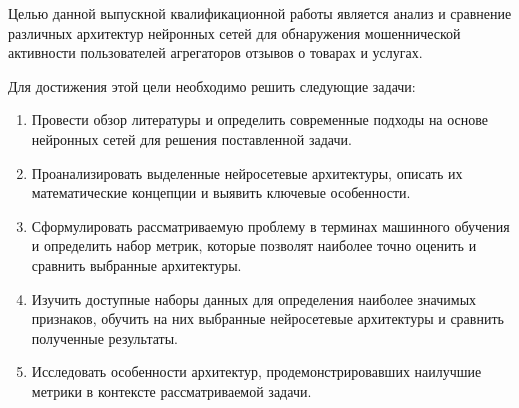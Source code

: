 
Целью данной выпускной квалификационной работы является анализ и сравнение различных архитектур нейронных сетей для обнаружения мошеннической активности пользователей агрегаторов отзывов о товарах и услугах.

Для достижения этой цели необходимо решить следующие задачи:

\begin{enumerate}

    \item Провести обзор литературы и определить современные подходы на основе нейронных сетей для решения поставленной задачи.
    
    \item Проанализировать выделенные нейросетевые архитектуры, описать их математические концепции и выявить ключевые особенности.
    
    \item Сформулировать рассматриваемую проблему в терминах машинного обучения и определить набор метрик, которые позволят наиболее точно оценить и сравнить выбранные архитектуры.
    
    \item Изучить доступные наборы данных для определения наиболее значимых признаков, обучить на них выбранные нейросетевые архитектуры и сравнить полученные результаты.

    \item Исследовать особенности архитектур, продемонстрировавших наилучшие метрики в контексте рассматриваемой задачи.
\end{enumerate}

\pagebreak
